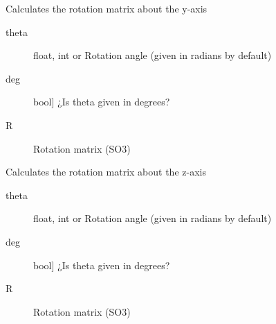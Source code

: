 \documentclass[letterpaper,10pt,english]{sphinxmanual}
\begin{document}

\begin{fulllineitems}
\label{\detokenize{_src/didactic:rkd.didactic.transformations.roty}}
Calculates the rotation matrix about the y-axis
\begin{description}
\item[{theta}] \leavevmode{[}float, int or \sphinxtitleref{symbolic}{]}
Rotation angle (given in radians by default)

\item[{deg}] \leavevmode{[}bool{]}
¿Is theta given in degrees?

\end{description}
\begin{description}
\item[{R}] \leavevmode{[}\sphinxtitleref{sympy.matrices.dense.MutableDenseMatrix}{]}
Rotation matrix (SO3)

\end{description}

\end{fulllineitems}


\begin{fulllineitems}
\label{\detokenize{_src/didactic:rkd.didactic.transformations.rotz}}
Calculates the rotation matrix about the z-axis
\begin{description}
\item[{theta}] \leavevmode{[}float, int or \sphinxtitleref{symbolic}{]}
Rotation angle (given in radians by default)

\item[{deg}] \leavevmode{[}bool{]}
¿Is theta given in degrees?

\end{description}
\begin{description}
\item[{R}] \leavevmode{[}\sphinxtitleref{sympy.matrices.dense.MutableDenseMatrix}{]}
Rotation matrix (SO3)

\end{description}

\end{fulllineitems}
\end{document}
